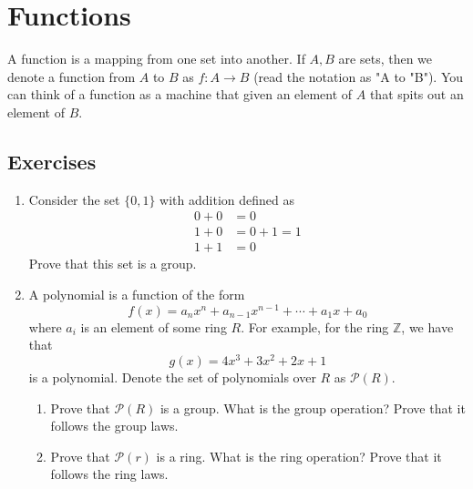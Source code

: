 \documentclass[../book.tex]{subfiles}
\begin{document}
\section{Functions}
A function is a mapping from one set into another. If $A, B$ are sets, then we denote a function from $A$ to $B$ as $f: A \to B$ (read the notation as "A to "B"). You can think of a function as a machine that given an element of $A$ that spits out an element of $B$.


\subsection{Exercises}

\begin{enumerate}
    \item Consider the set $\{0, 1\}$ with addition defined as 
    \begin{align}
        0 + 0 &= 0\\
        1 + 0 &= 0 + 1 = 1\\
        1 + 1 &= 0
    \end{align}
    Prove that this set is a group.
    \item A polynomial is a function of the form 
    \begin{equation}
        f(x) = a_n x^n + a_{n-1}x^{n-1} + \cdots + a_1 x + a_0
    \end{equation}
    where $a_i$ is an element of some ring $R$. For example, for the ring $\mathbb{Z}$, we have that
    \begin{equation}
        g(x) = 4x^3 + 3 x^2 + 2 x + 1
    \end{equation}
    is a polynomial. Denote the set of polynomials over $R$ as $\mathcal{P}(R)$.
    \begin{enumerate}
        \item Prove that $\mathcal{P}(R)$ is a group. What is the group operation? Prove that it follows the group laws.
        \item Prove that $\mathcal{P}(r)$ is a ring. What is the ring operation? Prove that it follows the ring laws.
    \end{enumerate}
\end{enumerate}
\end{document}
